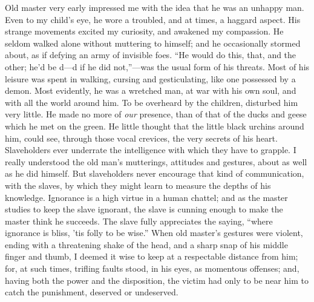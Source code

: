 Old master very early impressed me with the idea that he was an unhappy
man. Even to my child's eye, he wore a troubled, and at times, a haggard
aspect. His strange movements excited my curiosity, and awakened my
compassion. He seldom walked alone {\protect\hypertarget{81}{}{}}without
muttering to himself; and he occasionally stormed about, as if defying
an army of invisible foes. ``He would do this, that, and the other; he'd
be d---d if he did not,''---was the usual form of his threats. Most of
his leisure was spent in walking, cursing and gesticulating, like one
possessed by a demon. Most evidently, he was a wretched man, at war with
his own soul, and with all the world around him. To be overheard by the
children, disturbed him very little. He made no more of \emph{our}
presence, than of that of the ducks and geese which he met on the green.
He little thought that the little black urchins around him, could see,
through those vocal crevices, the very secrets of his heart.
Slaveholders ever underrate the intelligence with which they have to
grapple. I really understood the old man's mutterings, attitudes and
gestures, about as well as he did himself. But slaveholders never
encourage that kind of communication, with the slaves, by which they
might learn to measure the depths of his knowledge. Ignorance is a high
virtue in a human chattel; and as the master studies to keep the slave
ignorant, the slave is cunning enough to make the master think he
succeeds. The slave fully appreciates the saying, ``where ignorance is
bliss, 'tis folly to be wise.'' When old master's gestures were violent,
ending with a threatening shake of the head, and a sharp snap of his
middle finger and thumb, I deemed it wise to keep at a respectable
distance from him; for, at such times, trifling faults stood, in his
eyes, as momentous offenses; and, having both the power and the
disposition, the victim had only to {\protect\hypertarget{82}{}{}}be
near him to catch the punishment, deserved or undeserved.

